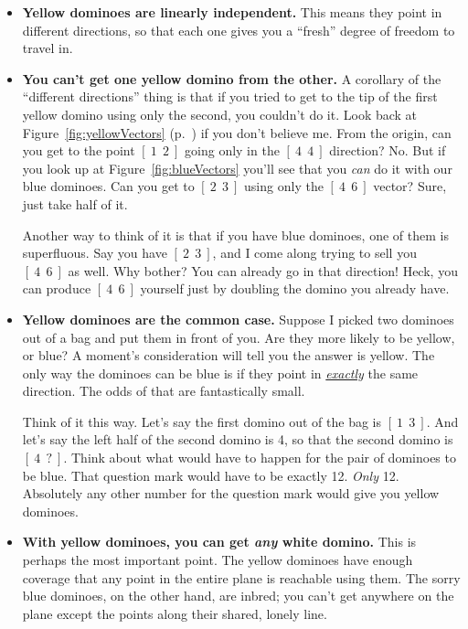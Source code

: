 \begin{itemize}
\itemsep.1em

\item \textbf{Yellow dominoes are linearly independent.} This means they point
in different directions, so that each one gives you a ``fresh'' degree of
freedom to travel in.


\item \textbf{You can't get one yellow domino from the other.} A corollary of
the ``different directions'' thing is that if you tried to get to the tip of
the first yellow domino using only the second, you couldn't do it. Look back at
Figure~\ref{fig:yellowVectors} (p.~\pageref{fig:yellowVectors}) if you don't
believe me. From the origin, can you get to the point $[\ 1\ \ 2\ ]$ going only
in the $[\ 4\ \ 4\ ]$ direction? No. But if you look up at
Figure~\ref{fig:blueVectors} you'll see that you \textit{can} do it with our
blue dominoes. Can you get to $[\ 2\ \ 3\ ]$ using only the $[\ 4\ \ 6\ ]$
vector? Sure, just take half of it.

Another way to think of it is that if you have blue dominoes, one of them is
superfluous. Say you have $[\ 2\ \ 3\ ]$, and I come along trying to sell you
$[\ 4\ \ 6\ ]$ as well. Why bother? You can already go in that direction! Heck,
you can produce $[\ 4\ \ 6\ ]$ yourself just by doubling the domino you already
have.


\item \textbf{Yellow dominoes are the common case.} Suppose I picked two
dominoes out of a bag and put them in front of you. Are they more likely to be
yellow, or blue? A moment's consideration will tell you the answer is yellow.
The only way the dominoes can be blue is if they point in
\underline{\textit{exactly}} the same direction. The odds of that are
fantastically small.

Think of it this way. Let's say the first domino out of the bag is $[\ 1\ \ 3\
]$. And let's say the left half of the second domino is 4, so that the second
domino is $[\ 4\ \ ?\ ]$. Think about what would have to happen for the pair of
dominoes to be blue. That question mark would have to be exactly 12.
\textit{Only} 12. Absolutely any other number for the question mark would give
you yellow dominoes.

\item \textbf{With yellow dominoes, you can get \textit{any} white domino.}
This is perhaps the most important point. The yellow dominoes have enough
coverage that any point in the entire plane is reachable using them. The sorry
blue dominoes, on the other hand, are inbred; you can't get anywhere on the
plane except the points along their shared, lonely line.


\end{itemize}
